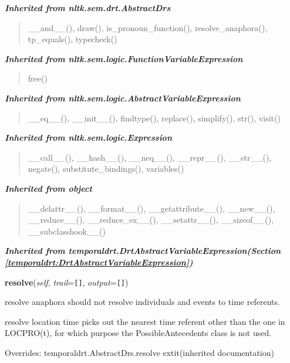 \large{\textbf{\textit{Inherited from nltk.sem.drt.AbstractDrs}}}

\begin{quote}
\_\_and\_\_(), draw(), is\_pronoun\_function(), resolve\_anaphora(), tp\_equals(), typecheck()
\end{quote}

\large{\textbf{\textit{Inherited from nltk.sem.logic.FunctionVariableExpression}}}

\begin{quote}
free()
\end{quote}

\large{\textbf{\textit{Inherited from nltk.sem.logic.AbstractVariableExpression}}}

\begin{quote}
\_\_eq\_\_(), \_\_init\_\_(), findtype(), replace(), simplify(), str(), visit()
\end{quote}

\large{\textbf{\textit{Inherited from nltk.sem.logic.Expression}}}

\begin{quote}
\_\_call\_\_(), \_\_hash\_\_(), \_\_neq\_\_(), \_\_repr\_\_(), \_\_str\_\_(), negate(), substitute\_bindings(), variables()
\end{quote}

\large{\textbf{\textit{Inherited from object}}}

\begin{quote}
\_\_delattr\_\_(), \_\_format\_\_(), \_\_getattribute\_\_(), \_\_new\_\_(), \_\_reduce\_\_(), \_\_reduce\_ex\_\_(), \_\_setattr\_\_(), \_\_sizeof\_\_(), \_\_subclasshook\_\_()
\end{quote}

\large{\textbf{\textit{Inherited from temporaldrt.DrtAbstractVariableExpression\textit{(Section \ref{temporaldrt:DrtAbstractVariableExpression})}}}}

    \vspace{0.5ex}

\hspace{.8\funcindent}\begin{boxedminipage}{\funcwidth}

    \raggedright \textbf{resolve}(\textit{self}, \textit{trail}={\tt \texttt{[}\texttt{]}}, \textit{output}={\tt \texttt{[}\texttt{]}})

\setlength{\parskip}{2ex}
    resolve anaphora should not resolve individuals and events to time 
    referents.

    resolve location time picks out the nearest time referent other than 
    the one in LOCPRO(t), for which purpose the PossibleAntecedents class 
    is not used.

\setlength{\parskip}{1ex}
      Overrides: temporaldrt.AbstractDrs.resolve 	extit{(inherited documentation)}

    \end{boxedminipage}


